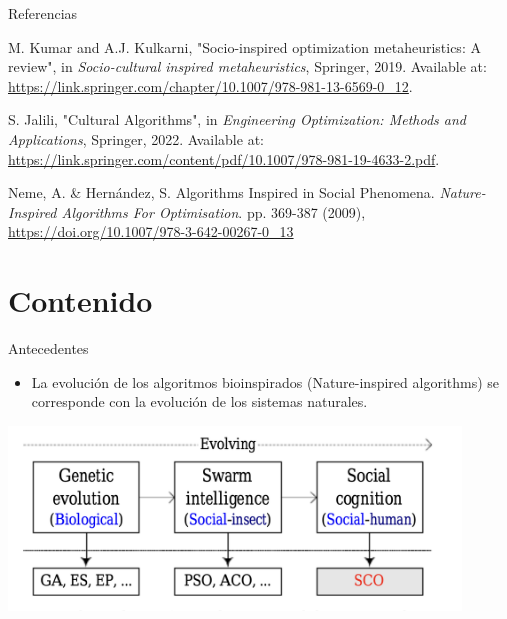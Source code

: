 \documentclass{beamer}
\begin{document}
\begin{frame}{Referencias}
\begin{thebibliography}{30}

M. Kumar and A.J. Kulkarni,
"Socio-inspired optimization metaheuristics: A review",
in \textit{Socio-cultural inspired metaheuristics}, Springer, 2019.
Available at: \url{https://link.springer.com/chapter/10.1007/978-981-13-6569-0_12}.

S. Jalili,
"Cultural Algorithms",
in \textit{Engineering Optimization: Methods and Applications}, Springer, 2022.
Available at: \url{https://link.springer.com/content/pdf/10.1007/978-981-19-4633-2.pdf}.

Neme, A. \& Hernández, S. Algorithms Inspired in Social Phenomena. {\em Nature-Inspired Algorithms For Optimisation}. pp. 369-387 (2009),  \url{https://doi.org/10.1007/978-3-642-00267-0_13}

\end{thebibliography}
\end{frame}


\section{Contenido}
\begin{frame}{Antecedentes}
    \begin{itemize}
        \item La evolución de los algoritmos bioinspirados (Nature-inspired algorithms) se corresponde con la evolución de los sistemas naturales.         
    \end{itemize}

    \vspace{0.5cm}
    \centering
    \includegraphics[width=0.9\textwidth]{classification_1.png}

\end{frame}
\end{document}
